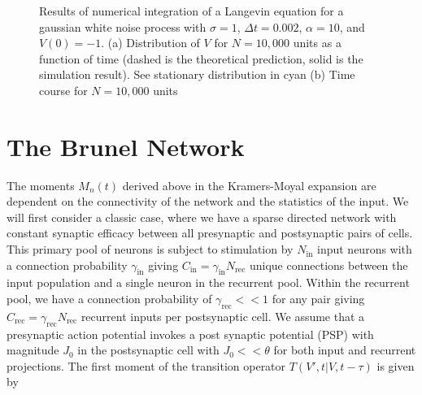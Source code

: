 \documentclass{ucetd}
\begin{document}
\begin{figure}
\centering
{}
\caption{Results of numerical integration of a Langevin equation for a gaussian white noise process with $\sigma = 1$, $\Delta t=0.002$, $\alpha=10$, and $V(0)=-1$. (a) Distribution of $V$ for $N=10,000$ units as a function of time (dashed is the theoretical prediction, solid is the simulation result). See stationary distribution in cyan (b) Time course for $N=10,000$ units}
\end{figure}


\chapter{The Brunel Network}

The moments $M_{n}(t)$ derived above in the Kramers-Moyal expansion are dependent on the connectivity of the network and the statistics of the input. We will first consider a classic case, where we have a sparse directed network with constant synaptic efficacy between all presynaptic and postsynaptic pairs of cells. This primary pool of neurons is subject to stimulation by $N_{\mathrm{in}}$ input neurons with a connection probability $\gamma_{\mathrm{in}}$ giving $C_{\mathrm{in}} = \gamma_{\mathrm{in}}N_{\mathrm{rec}}$ unique connections between the input population and a single neuron in the recurrent pool. Within the recurrent pool, we have a connection probability of $\gamma_{\mathrm{rec}} << 1$ for any pair giving $C_{\mathrm{rec}} = \gamma_{\mathrm{rec}} N_{\mathrm{rec}}$ recurrent inputs per postsynaptic cell. We assume that a presynaptic action potential invokes a post synaptic potential (PSP) with magnitude $J_{0}$ in the postsynaptic cell with $J_{0} << \theta$ for both input and recurrent projections. The first moment of the transition operator $T(V',t| V,t-\tau)$ is given by
\end{document}
